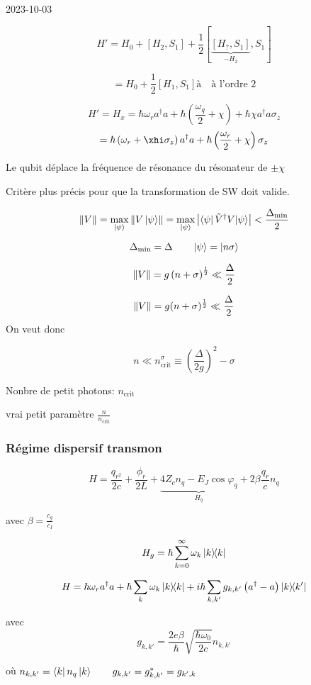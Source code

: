 


2023-10-03

\[ H' = H_0 + [H_2, S_1 ] + \frac{1}{2} \left[ \underbrace{[H_?, S_1]}_{-H_2} , S_1  \right]  \]

\[ = H_0 + \frac{1}{2} [H_1, S_1] à 	\quad \text{à l'ordre 2} \]

\[ H' = H_x = \hbar \omega_r a^{\dagger}a + \hbar \left( \frac{\omega_q}{2}  + \chi \right)  + \hbar \chi a^{\dagger} a \sigma_z \]
\[ = \hbar \left( \omega_r + \xhi \sigma_z  \right)a^{\dagger} a + \hbar \left( \frac{\omega_r}{2} + \chi \right) \sigma_z \]

Le qubit déplace la fréquence de résonance du résonateur de $\pm \chi$ 

Critère plus précis pour que la transformation de SW doit valide.

\[ \norm{V}  = \max_{\ket{\psi}} \norm{V \ket{\psi}} = \max_{\ket{\psi}} \abs{\bra{\psi}{\tilde V ^{\dagger} V}{\ket{\psi}}} < \frac{\Delta_{\text{min}}}{2}  \]

\[ \Delta_{\text{min}} = \Delta \qquad \ket{\psi} = \ket{n\sigma}  \]

\[ \norm{V} = g \left( n + \sigma \right)^{\frac{1}{2} } \ll \frac{\Delta}{2}   \]

\[ \norm{V} = g (n+\sigma)^{\frac{1}{2} } \ll \frac{\Delta}{2} \]
On veut donc

\[ n \ll n_{\text{crit}}^\sigma \equiv \left( \frac{\Delta}{2g}  \right)^2 - \sigma \]

Nonbre de petit photons: $n_{\text{crit}} $

vrai petit paramètre $\frac{n}{n_{\text{crit}}} $

\setcounter{section}{4}
\setcounter{subsection}{3}
\setcounter{subsubsection}{2}

\subsubsection{Régime dispersif transmon}


\[ H =  \frac{q_{r^2} }{2c} + \frac{\phi_r}{2L} + \underbrace{4 Z_c n_q - E_J \cos\varphi_q}_{H_q } +2 \beta \frac{q_r}{c} n_q   \]

avec $	\beta = \frac{c_g}{c_I} $


\[ H_g = \hbar \sum_{k=0}^{\infty} \omega_k \ketbra{k} \]

\[ H = \hbar \omega_r a^{\dagger}a + \hbar \sum_{k} \omega_k \ketbra{k} + i \hbar \sum_{k,k'} g_{k,k'} \left( a^{\dagger} -a  \right) \ketbra{k}{k'}\]


avec \[ 	g_{k,k'} = \frac{2e\beta}{\hbar} \sqrt{\frac{\hbar\omega_0 }{2c} } n_{k,k'} \]

où $n_{k,k'} = \bra{k}n_q \ket{k} \qquad g_{k,k'} = g_{k,k'} ^{*}= g_{k',k} $









